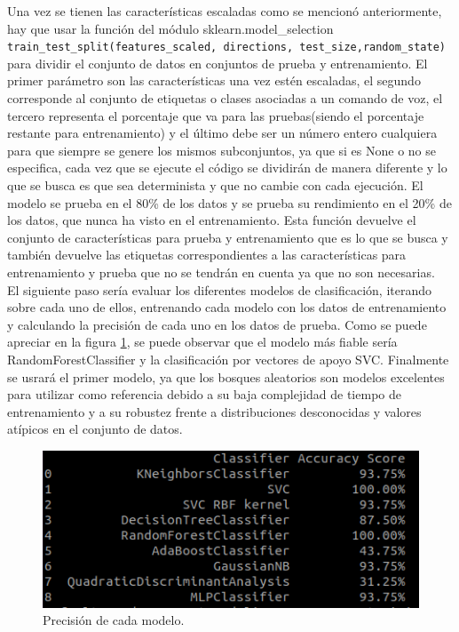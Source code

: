 Una vez se tienen las características escaladas como se mencionó anteriormente, hay que usar la función del módulo sklearn.model\_selection \verb|train_test_split(features_scaled, directions, test_size,random_state)| para dividir el conjunto de datos en conjuntos de prueba y entrenamiento. El primer parámetro son las características una vez estén escaladas, el segundo corresponde al conjunto de etiquetas o clases asociadas a un comando de voz, el tercero representa el porcentaje que va para las pruebas(siendo el porcentaje restante para entrenamiento) y el último debe ser un número entero cualquiera para que siempre se genere los mismos subconjuntos, ya que si es None o no se especifica, cada vez que se ejecute el código se dividirán de manera diferente y lo que se busca es que sea determinista y que no cambie con cada ejecución. El modelo se prueba en el 80\% de los datos y se prueba su rendimiento en el 20\% de los datos, que nunca ha visto en el entrenamiento. Esta función devuelve el conjunto de características para prueba y entrenamiento que es lo que se busca y también devuelve las etiquetas correspondientes a las características para entrenamiento y prueba que no se tendrán en cuenta ya que no son necesarias.\\

El siguiente paso sería evaluar los diferentes modelos de clasificación, iterando sobre cada uno de ellos, entrenando cada modelo con los datos de entrenamiento y calculando la precisión de cada uno en los datos de prueba. Como se puede apreciar en la figura \ref{fig:modelos}, se puede observar que el modelo más fiable sería RandomForestClassifier y la clasificación por vectores de apoyo SVC. Finalmente se usrará el primer modelo, ya que los bosques aleatorios son modelos excelentes para utilizar como referencia debido a su baja complejidad de tiempo de entrenamiento y a su robustez frente a distribuciones desconocidas y valores atípicos en el conjunto de datos.

\begin{figure}[H]
  \centering
  \includegraphics[scale=0.6]{figs/modelos} %
  \caption{ Precisión de cada modelo.}
  \label{fig:modelos}
\end{figure} 

